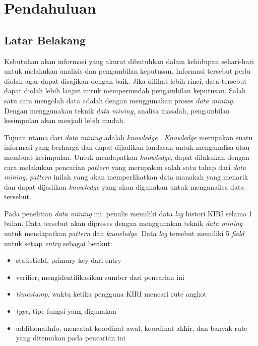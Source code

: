 \chapter{Pendahuluan}
\label{chap:intro}

\section{Latar Belakang}
\label{sec:motivation}

Kebutuhan akan informasi yang akurat dibutuhkan dalam kehidupan sehari-hari untuk melakukan analisis dan pengambilan keputusan. Informasi tersebut perlu diolah agar dapat disajikan dengan baik. Jika dilihat lebih rinci, data tersebut dapat diolah lebih lanjut untuk mempermudah pengambilan keputusan. Salah satu cara mengolah data adalah dengan menggunakan proses \textsl{data mining}. Dengan menggunakan teknik \textsl{data mining}, analisa masalah, pengambilan kesimpulan akan menjadi lebih mudah.

Tujuan utama dari \textsl{data mining} adalah \textsl{knowledge} \cite{DM}. \textsl{Knowledge} merupakan suatu informasi yang berharga dan dapat dijadikan landasan untuk menganalisa atau membuat kesimpulan. Untuk mendapatkan \textsl{knowledge}, dapat dilakukan dengan cara melakukan pencarian \textsl{pattern} yang merupakan salah satu tahap dari \textsl{data mining}. \textsl{pattern}  inilah yang akan memperlihatkan data manakah yang menarik dan dapat dijadikan \textsl{knowledge} yang akan digunakan untuk menganalisa data tersebut.

Pada penelitian \textsl{data mining} ini, penulis memiliki data \textsl{log} histori KIRI selama 1 bulan. Data tersebut akan diproses dengan menggunakan teknik \textsl{data mining} untuk mendapatkan \textsl{pattern} dan \textsl{knowledge}. Data \textsl{log} tersebut memiliki 5 \textsl{field} untuk setiap \textsl{entry} sebagai berikut:
\begin{itemize}
	\item statisticId, primary key dari entry
	\item verifier, mengidentifikasikan sumber dari pencarian ini
	\item \textsl{timestamp}, waktu ketika pengguna KIRI mencari rute angkot
	\item \textsl{type}, tipe fungsi yang digunakan
	\item additionalInfo, mencatat koordinat awal, koordinat akhir, dan banyak rute yang ditemukan pada pencarian ini
\end{itemize}
  
